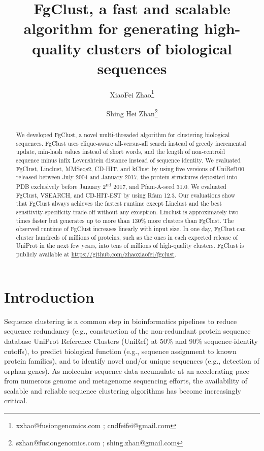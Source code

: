 \documentclass[11pt,letterpaper]{article}
\title{FgClust, a fast and scalable algorithm for generating high-quality clusters of biological sequences}
\author[1]{XiaoFei Zhao\thanks{xzhao@fusiongenomics.com ;  cndfeifei@gmail.com}}
\author[1]{Shing Hei Zhan\thanks{szhan@fusiongenomics.com ; shing.zhan@gmail.com}}
\affil[1]{Fusion Genomics Corporation 
}
\begin{document}
\maketitle

\begin{abstract}
We developed FgClust, a novel multi-threaded algorithm for clustering biological sequences.
FgClust uses clique-aware all-versus-all search instead of greedy incremental update, min-hash values instead of short words, and the length of non-centroid sequence minus infix Levenshtein distance instead of sequence identity.
We evaluated FgClust, Linclust, MMSeqs2, CD-HIT, and kClust by using
five versions of UniRef100 released between July 2004 and January 2017, 
the protein structures deposited into PDB exclusively before January 2\textsuperscript{nd} 2017, and Pfam-A-seed 31.0.
We evaluated FgClust, VSEARCH, and CD-HIT-EST by using Rfam 12.3.
Our evaluations show that FgClust always achieves the fastest runtime except Linclust and the best sensitivity-specificity trade-off without any exception.
Linclust is approximately two times faster but generates up to more than 130\% more clusters than FgClust.
The observed runtime of FgClust increases linearly with input size.
In one day, FgClust can cluster hundreds of millions of proteins, such as the ones in each expected release of UniProt in the next few years, into tens of millions of high-quality clusters.
FgClust is publicly available at \url{https://github.com/zhaoxiaofei/fgclust}.
\end{abstract}

\clearpage{}

\section{Introduction}

Sequence clustering is a common step in bioinformatics pipelines to reduce sequence redundancy (e.g., construction of the non-redundant protein sequence database UniProt Reference Clusters (UniRef) at 50\% and 90\% sequence-identity cutoffs), to predict biological function (e.g., sequence assignment to known protein families), and to identify novel and/or unique sequences (e.g., detection of orphan genes). As molecular sequence data accumulate at an accelerating pace from numerous genome and metagenome sequencing efforts, the availability of scalable and reliable sequence clustering algorithms has become increasingly critical.

\end{document}
